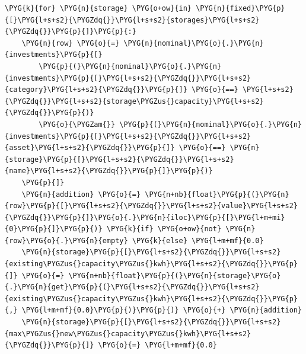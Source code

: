 \begin{Verbatim}
\PYG{k}{for} \PYG{n}{storage} \PYG{o+ow}{in} \PYG{n}{fixed}\PYG{p}{[}\PYG{l+s+s2}{\PYGZdq{}}\PYG{l+s+s2}{storages}\PYG{l+s+s2}{\PYGZdq{}}\PYG{p}{]}\PYG{p}{:}
    \PYG{n}{row} \PYG{o}{=} \PYG{n}{nominal}\PYG{o}{.}\PYG{n}{investments}\PYG{p}{[}
        \PYG{p}{(}\PYG{n}{nominal}\PYG{o}{.}\PYG{n}{investments}\PYG{p}{[}\PYG{l+s+s2}{\PYGZdq{}}\PYG{l+s+s2}{category}\PYG{l+s+s2}{\PYGZdq{}}\PYG{p}{]} \PYG{o}{==} \PYG{l+s+s2}{\PYGZdq{}}\PYG{l+s+s2}{storage\PYGZus{}capacity}\PYG{l+s+s2}{\PYGZdq{}}\PYG{p}{)}
        \PYG{o}{\PYGZam{}} \PYG{p}{(}\PYG{n}{nominal}\PYG{o}{.}\PYG{n}{investments}\PYG{p}{[}\PYG{l+s+s2}{\PYGZdq{}}\PYG{l+s+s2}{asset}\PYG{l+s+s2}{\PYGZdq{}}\PYG{p}{]} \PYG{o}{==} \PYG{n}{storage}\PYG{p}{[}\PYG{l+s+s2}{\PYGZdq{}}\PYG{l+s+s2}{name}\PYG{l+s+s2}{\PYGZdq{}}\PYG{p}{]}\PYG{p}{)}
    \PYG{p}{]}
    \PYG{n}{addition} \PYG{o}{=} \PYG{n+nb}{float}\PYG{p}{(}\PYG{n}{row}\PYG{p}{[}\PYG{l+s+s2}{\PYGZdq{}}\PYG{l+s+s2}{value}\PYG{l+s+s2}{\PYGZdq{}}\PYG{p}{]}\PYG{o}{.}\PYG{n}{iloc}\PYG{p}{[}\PYG{l+m+mi}{0}\PYG{p}{]}\PYG{p}{)} \PYG{k}{if} \PYG{o+ow}{not} \PYG{n}{row}\PYG{o}{.}\PYG{n}{empty} \PYG{k}{else} \PYG{l+m+mf}{0.0}
    \PYG{n}{storage}\PYG{p}{[}\PYG{l+s+s2}{\PYGZdq{}}\PYG{l+s+s2}{existing\PYGZus{}capacity\PYGZus{}kwh}\PYG{l+s+s2}{\PYGZdq{}}\PYG{p}{]} \PYG{o}{=} \PYG{n+nb}{float}\PYG{p}{(}\PYG{n}{storage}\PYG{o}{.}\PYG{n}{get}\PYG{p}{(}\PYG{l+s+s2}{\PYGZdq{}}\PYG{l+s+s2}{existing\PYGZus{}capacity\PYGZus{}kwh}\PYG{l+s+s2}{\PYGZdq{}}\PYG{p}{,} \PYG{l+m+mf}{0.0}\PYG{p}{)}\PYG{p}{)} \PYG{o}{+} \PYG{n}{addition}
    \PYG{n}{storage}\PYG{p}{[}\PYG{l+s+s2}{\PYGZdq{}}\PYG{l+s+s2}{max\PYGZus{}new\PYGZus{}capacity\PYGZus{}kwh}\PYG{l+s+s2}{\PYGZdq{}}\PYG{p}{]} \PYG{o}{=} \PYG{l+m+mf}{0.0}
\end{Verbatim}
